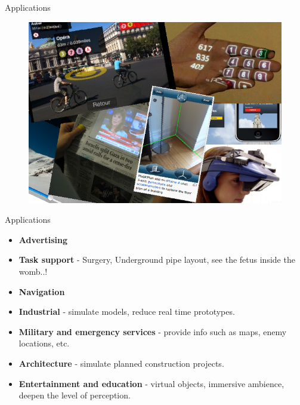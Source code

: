 \documentclass{beamer}
\begin{document}
\begin{frame}{Applications}
	\begin{figure}
		\includegraphics[scale=.40]{collage.png}\\
	\end{figure}
\end{frame}


\begin{frame}{Applications}
	\begin{itemize}
		\item \textbf{Advertising}
		\item \textbf{Task support} - Surgery, Underground pipe layout, see the fetus inside the womb..!
		\item \textbf{Navigation}
		\item \textbf{Industrial} - simulate models, reduce real time prototypes.
		\item \textbf{Military and emergency services} - provide info such as maps, enemy locations, etc.
		\item \textbf{Architecture} - simulate planned construction projects.
		\item \textbf{Entertainment and education} - virtual objects, immersive ambience, deepen the level of perception.
	\end{itemize}
\end{frame}
\end{document}
